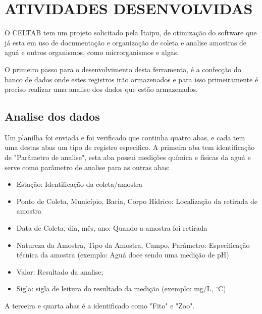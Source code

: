 \chapter{ATIVIDADES DESENVOLVIDAS}
\vspace*{-2cm}

O CELTAB tem um projeto solicitado pela Itaipu, de otimização do software que já esta em uso de documentação e organização de coleta e analise amostras de aguá e outros organismos, como microrganismos e algas.

O primeiro passo para o desenvolvimento desta ferramenta, é a confecção do banco de dados onde estes registros irão armazenados e para isso primeiramente é preciso realizar uma analise dos dados que estão armazenados.

\section{Analise dos dados}

Um planilha foi enviada e foi verificado que continha quatro abas, e cada tem uma destas abas um tipo de registro especifico. A primeira aba tem identificação de "Parâmetro de analise", esta aba possui medições química e físicas da aguá e serve como parâmetro de analise para as outras abas:
\begin{itemize}
\singlespacing
\item   Estação: Identificação da coleta/amostra
\item   Ponto de Coleta, Município, Bacia, Corpo Hídrico: Localização da retirada de amostra
\item   Data de Coleta, dia, mês, ano: Quando a amostra foi retirada
\item   Natureza da Amostra, Tipo da Amostra, Campo, Parâmetro: Especificação técnica da amostra (exemplo: Aguá doce sendo uma medição de pH)
\item   Valor: Resultado da analise;
\item   Sigla: sigla de leitura do resultado da medição (exemplo: mg/L, $^{\circ}$C)
\end{itemize}

A terceira e quarta abas é a identificado como "Fito" e "Zoo".

